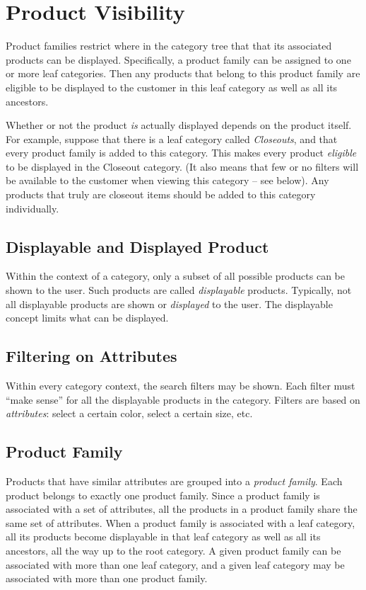 \documentclass[letterpaper, 12pt]{article}
\begin{document}
\section{Product Visibility}
Product families restrict where in the category tree that that its associated products can be displayed.  Specifically, a product family can be assigned to one or more leaf categories.  Then any products that belong to this product family are eligible to be displayed to the customer in this leaf category as well as all its ancestors.

Whether or not the product \textit{is} actually displayed depends on the product itself.  For example, suppose that there is a leaf category called \textit{Closeouts}, and that every product family is added to this category.  This makes every product \textit{eligible} to be displayed in the Closeout category.  (It also means that few or no filters will be available to the customer when viewing this category -- see below).  Any products that truly are closeout items should be added to this category individually.


\subsection{Displayable and Displayed Product}
Within the context of a category, only a subset of all possible products can be shown to the user.  Such products are called {\em displayable} products.  Typically, not all displayable products are shown or {\em displayed} to the user.  The displayable concept limits what can be displayed.

\subsection{Filtering on Attributes}
Within every category context, the search filters may be shown.  Each filter must ``make sense'' for all the displayable products in the category.  Filters are based on {\em attributes}: select a certain color, select a certain size, etc.

\subsection{Product Family}
Products that have similar attributes are grouped into a {\em product family}.  Each product belongs to exactly one product family.  Since a product family is associated with a set of attributes, all the products in a product family share the same set of attributes.  When a product family is associated with a leaf category, all its products become displayable in that leaf category as well as all its ancestors, all the way up to the root category.  A given product family can be associated with more than one leaf category, and a given leaf category may be associated with more than one product family.
\end{document}
